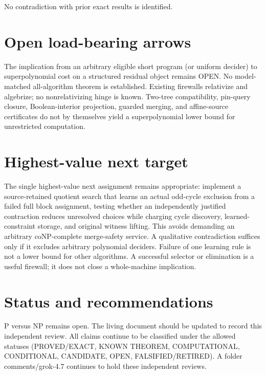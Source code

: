 \documentclass[11pt]{article}
\begin{document}
No contradiction with prior exact results is identified.

\section{Open load-bearing arrows}
The implication from an arbitrary eligible short program (or uniform decider) to superpolynomial cost on a structured residual object remains OPEN. No model-matched all-algorithm theorem is established. Existing firewalls relativize and algebrize; no nonrelativizing hinge is known. Two-tree compatibility, pin-query closure, Boolean-interior projection, guarded merging, and affine-source certificates do not by themselves yield a superpolynomial lower bound for unrestricted computation.

\section{Highest-value next target}
The single highest-value next assignment remains appropriate: implement a source-retained quotient search that learns an actual odd-cycle exclusion from a failed full block assignment, testing whether an independently justified contraction reduces unresolved choices while charging cycle discovery, learned-constraint storage, and original witness lifting. This avoids demanding an arbitrary coNP-complete merge-safety service. A qualitative contradiction suffices only if it excludes arbitrary polynomial deciders. Failure of one learning rule is not a lower bound for other algorithms. A successful selector or elimination is a useful firewall; it does not close a whole-machine implication.

\section{Status and recommendations}
P versus NP remains open. The living document should be updated to record this independent review. All claims continue to be classified under the allowed statuses (PROVED/EXACT, KNOWN THEOREM, COMPUTATIONAL, CONDITIONAL, CANDIDATE, OPEN, FALSIFIED/RETIRED). A folder comments/grok-4.7 continues to hold these independent reviews.

\end{document}
